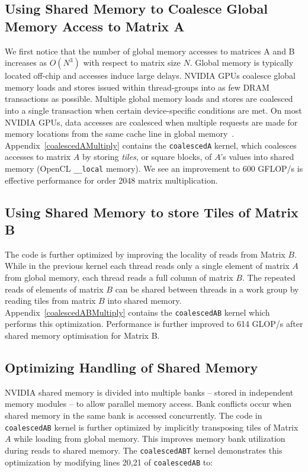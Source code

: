 \documentclass[review=false, sigchi]{acmart}
\begin{document}
	\subsection{Using Shared Memory to Coalesce Global Memory Access to Matrix A} 
	
	We first notice that the number of global memory accesses to matrices A and B increases as $O(N^3)$ with respect to matrix size $N$.
	Global memory is typically located off-chip and accesses induce large delays.
	NVIDIA GPUs coalesce global memory loads and stores issued within thread-groups into as few DRAM transactions as possible.
	Multiple global memory loads and stores are coalesced into a single transaction when certain device-specific conditions are met. 
	On most NVIDIA GPUs, data accesses are coalesced when multiple requests are made for memory locations from the same cache line in global memory~\cite{cudamanual}.
	Appendix~\ref{coalescedAMultiply} contains the \texttt{coalescedA} kernel, which coalesces accesses to matrix $A$ by storing \emph{tiles}, or square blocks, of $A$'s values into shared memory (OpenCL \texttt{\_\_local} memory). 
	We see an improvement to 600 GFLOP/s is effective performance for order 2048 matrix multiplication.
	
	
	\subsection{Using Shared Memory to store Tiles of Matrix B} 
	
	The code is further optimized by improving the locality of reads from Matrix $B$.
	While in the previous kernel each thread reads only a single element of matrix $A$ from global memory, each thread reads a full column of matrix $B$.
	The repeated reads of elements of matrix $B$ can be shared between threads in a work group by reading tiles from matrix $B$ into shared memory.
	Appendix~\ref{coalescedABMultiply} contains the \texttt{coalescedAB} kernel which performs this optimization.
	Performance is further improved to 614 GLOP/s after shared memory optimisation for Matrix B.
	
	\subsection{Optimizing Handling of Shared Memory} 
	
	NVIDIA shared memory is divided into multiple banks -- stored in independent memory modules -- to allow parallel memory access.
	Bank conflicts occur when shared memory in the same bank is accessed concurrently.
	The code in \texttt{coalescedAB} kernel is further optimized by implicitly transposing tiles of Matrix $A$ while loading from global memory. This improves memory bank utilization during reads to shared memory. The \texttt{coalescedABT} kernel demonstrates this optimization by modifying lines 20,21 of \texttt{coalescedAB} to:
	
\end{document}
